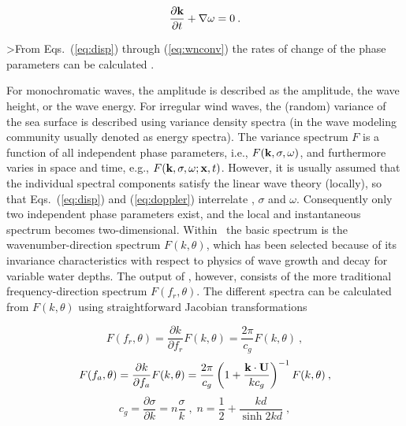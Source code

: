 \begin{equation}
\frac{\partial {\mbox{\bf k}}}{\partial t} + \nabla \omega = 0 \: .
\label{eq:wnconv}
\end{equation}

\noindent
>From Eqs.~(\ref{eq:disp}) through (\ref{eq:wnconv}) the rates of change of the
phase parameters can be calculated \citep[e.g.,][equations not reproduced
here]{rep:Chr82,bk:Mei83,tol:JPO90}.

For monochromatic waves, the amplitude is described as the amplitude, the wave
height, or the wave energy. For irregular wind waves, the (random) variance of
the sea surface is described using variance density spectra (in the wave
modeling community usually denoted as energy spectra). The variance spectrum
$F$ is a function of all independent phase parameters, i.e.,
$F({\mbox{\bf k}},\sigma,\omega)$, and furthermore varies in space and time, e.g.,
$F({\mbox{\bf k}},\sigma,\omega ;\mbox{\bf x},t)$. However, it is usually assumed that the
individual spectral components satisfy the linear wave theory (locally), so
that Eqs.~(\ref{eq:disp}) and (\ref{eq:doppler}) interrelate {\bk}, $\sigma$
and $\omega$. Consequently only two independent phase parameters exist, and
the local and instantaneous spectrum becomes two-dimensional. Within \ws\ the
basic spectrum is the wavenumber-direction spectrum $F(k,\theta)$, which has
been selected because of its invariance characteristics with respect to
physics of wave growth and decay for variable water depths. The output of \ws,
however, consists of the more traditional frequency-direction spectrum
$F(f_r,\theta)$. The different spectra can be calculated from $F(k,\theta)$
using straightforward Jacobian transformations


\begin{equation}
F(f_r,\theta) = \frac{\partial k}{\partial f_r} F(k,\theta) =
\frac{2\pi}{c_g} F(k,\theta) \: ,
\label{eq:jac_fr}
\end{equation}
\begin{equation}
F(f_a,\theta) = \frac{\partial k}{\partial f_a} F(k,\theta) =
\frac{2\pi}{c_g}
\left ( 1 + \frac{{\mbox{\bf k}}\cdot{\bf U}}{k c_g}\right )^{-1}
F(k,\theta) \: ,
\label{eq:jac_fa}
\end{equation}
\begin{equation}
c_g = \frac{\partial \sigma}{\partial k} = n \frac{\sigma}{k}
\; , \;
n = \frac{1}{2} + \frac{kd}{\sinh 2kd} \; ,
\label{eq:cg}
\end{equation}

